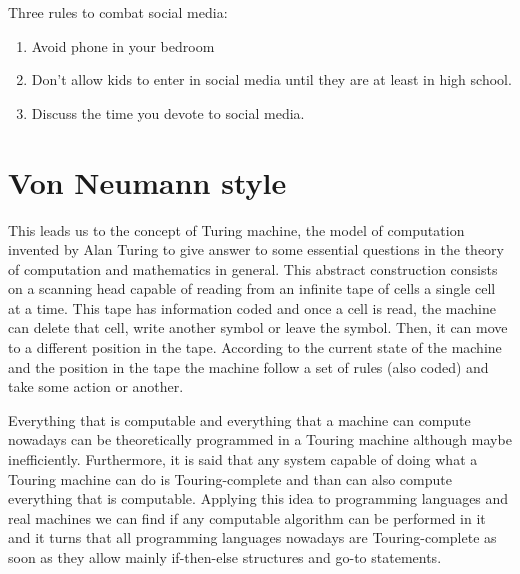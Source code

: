   
%  
%  
%  
% 

  
   
Three rules to combat social media:
\begin{enumerate} 
\item Avoid phone in your bedroom
\item Don't allow kids to enter in social media until they are at least in high school. 
\item Discuss the time you devote to social media. 
\end{enumerate} 

 
\newpage   
    \section{Von Neumann style} 




This leads us to the concept of Turing machine, the model of computation invented by Alan Turing to give answer to some essential questions 
in the theory of computation and mathematics in general. This abstract construction consists on a scanning head capable of reading from an 
infinite tape of cells a single cell at a time. This tape has information coded and once a cell is read, the machine can delete that cell, 
write another symbol or leave the symbol. Then, it can move to a different position in the tape. According to the current state of the 
machine and the position in the tape the machine follow a set of rules (also coded) and take some action or another. 

Everything that is computable and everything that a machine can compute nowadays can be theoretically programmed in a Touring machine 
although maybe inefficiently. Furthermore, it is said that any system capable of doing what a Touring machine can do is Touring-complete and 
than can also compute everything that is computable. Applying this idea to programming languages and real machines we can find if any 
computable algorithm can be performed in it and it turns that all programming languages nowadays are Touring-complete as soon as they allow 
mainly if-then-else structures and go-to statements. 

